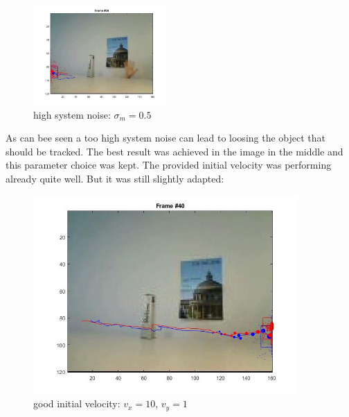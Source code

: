 \documentclass[12pt]{article}
\begin{document}
\begin{figure}[H]
	\centering
	\includegraphics[width=0.45\textwidth]{observe_05.jpg}
	\caption{high system noise: $\sigma_m = 0.5$}
	\label{fig1}
\end{figure}
As can bee seen a too high system noise can lead to loosing the object that should be tracked. The best result was achieved in the image in the middle and this parameter choice was kept. 
\newline
The provided initial velocity was performing already quite well. But it was still slightly adapted:
\begin{figure}[H]
	\centering
	\includegraphics[width=0.9\textwidth]{v-1.jpg}
	\caption{good initial velocity: $v_x = 10$, $v_y=1$}
	\label{fig1}
\end{figure}
\end{document}
